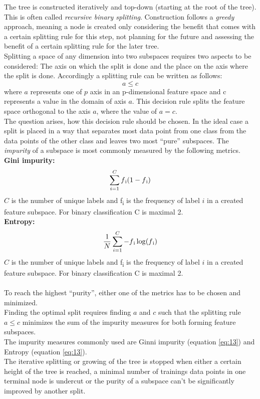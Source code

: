 The tree is constructed iteratively and top-down (starting at the root of the tree). This is often called \emph{recursive binary splitting}. Construction follows a \emph{greedy} approach, meaning a node is created only considering the benefit that comes with a certain splitting rule for this step, not planning for the future and assessing the benefit of a certain splitting rule for the later tree.
\\
Splitting a space of any dimension into two subspaces requires two aspects to be considered: The axis on which the split is done and the place on the axis where the split is done. Accordingly a splitting rule can be written as follows:
\begin{equation} \label{eq:12}
a \leq c
\end{equation}
where $a$ represents one of $p$ axis in an p-dimensional feature space and c represents a value in the domain of axis $a$.
This decision rule splits the feature space orthogonal to the axis $a$, where the value of $a = c$.
\\
The question arises, how this decision rule should be chosen.
In the ideal case a split is placed in a way that separates most data point from one class from the data points of the other class and leaves two most ``pure'' subspaces. The \emph{impurity} of a subspace is most commonly measured by the following metrics. 
\\
\textbf{Gini impurity:}  \\
\begin{equation} \label{eq:13}
\sum_{i=1}^{C} f\textsubscript{i}(1-f\textsubscript{i})
\end{equation}
$C$ is the number of unique labels and f\textsubscript{i} is the frequency of label $i$ in a created feature subspace. For binary classification C is maximal 2.\\
\textbf{Entropy:}
\begin{equation} \label{eq:14}
\frac{1}{N}\sum_{i=1}^{C} -f\textsubscript{i}\log(f\textsubscript{i})
\end{equation}
$C$ is the number of unique labels and f\textsubscript{i} is the frequency of label $i$ in a created feature subspace. For binary classification C is maximal 2. \\
\\
To reach the highest ``purity'', either one of the metrics has to be chosen and minimized. \\
Finding the optimal split requires finding $a$ and $c$ such that the splitting rule  $a \leq c$ minimizes the sum of the impurity measures for both forming feature subspaces.
\\
The impurity measures commonly used are Ginni impurity (equation \ref{eq:13}) and Entropy (equation \ref{eq:13}). 
\\
The iterative splitting or growing of the tree is stopped when either a certain height of the tree is reached, a minimal number of trainings data points in one terminal node is undercut or the purity of a subspace can't be significantly improved by another split.
\\

